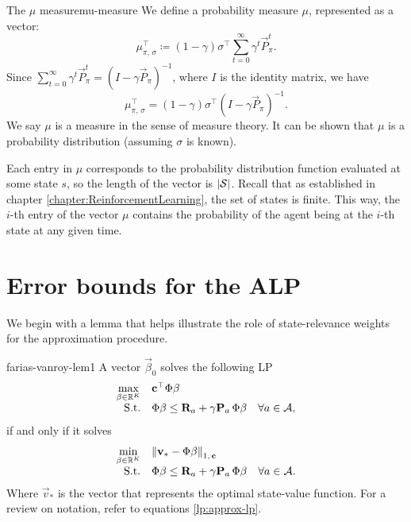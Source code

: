 \begin{dfn}{The $\mu$ measure}{mu-measure}
    We define a probability measure $\mu$, represented as a vector:
    \[
        \mu_{\pi, \, \sigma}^{\top} \coloneqq (1 - \gamma) \sigma^{\top} \sum_{t=0}^{\infty} \gamma^{t} \vec{P}_{\pi}^{t}.
    \]
    Since $\sum_{t=0}^{\infty} \gamma^{t} \vec{P}_{\pi}^{t} = (I - \gamma
    \vec{P}_\pi)^{-1}$, where $I$ is the identity matrix, we have
    \[
        \mu_{\pi, \, \sigma}^{\top} = (1 - \gamma) \sigma^{\top} (I - \gamma \vec{P}_{\pi})^{-1}.
    \]
    We say $\mu$ is a measure in the sense of measure theory. It can be shown
    \Cite[pg.~864]{farias2003LP2ADP} that $\mu$ is a probability distribution
    (assuming $\sigma$ is known).
\end{dfn}

Each entry in $\mu$ corresponds to the probability distribution function
evaluated at some state $s$, so the length of the vector is $|\mathcal{S}|$. Recall
that as established in chapter \ref{chapter:ReinforcementLearning}, the set of
states is finite. This way, the $i$-th entry of the vector $\mu$ contains the
probability of the agent being at the $i$-th state at any given time.

\section{Error bounds for the ALP}

We begin with a lemma that helps illustrate the role of state-relevance weights
for the approximation procedure.

\begin{lemma}{}{farias-vanroy-lem1}
    A vector $\vec{\beta}_0$ solves the following LP
    \[
    \begin{array}{rl@{}ll}
        \displaystyle \max_{\vec{\beta} \in \R^{K}} & \vec{c}^{\top} \Phi \vec{\beta} \\
        \text{S.t.} & \displaystyle \Phi \vec{\beta} \leq \vec{R}_a + \gamma \vec{P}_a \, \Phi \vec{\beta} & \quad \forall a \in \Actions, \\
    \end{array}
    \]
    if and only if it solves
    \[
    \begin{array}{rl@{}ll}
        \displaystyle \min_{\vec{\beta} \in \R^{K}} & \left\| \vec{v}_* - \Phi \vec{\beta} \right\|_{1, \, \vec{c}} \\
        \text{S.t.} & \displaystyle \Phi \vec{\beta} \leq \vec{R}_a + \gamma \vec{P}_a \, \Phi \vec{\beta} & \quad \forall a \in \Actions. \\
    \end{array}
    \]
    Where $\vec{v}_*$ is the vector that represents the optimal state-value
    function. For a review on notation, refer to equations \ref{lp:approx-lp}.
\end{lemma}


